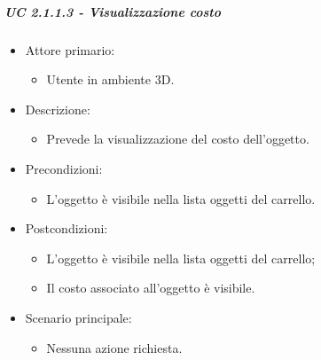 \subparagraph{UC 2.1.1.3 - Visualizzazione costo}
\begin{itemize}
	
	\item Attore primario: 
	\begin{itemize}
		\item Utente in ambiente 3D.
	\end{itemize}
	\item Descrizione:
	\begin{itemize}
		\item Prevede la visualizzazione del costo dell'oggetto.
	\end{itemize}
	
	\item Precondizioni:
	\begin{itemize}
		\item L'oggetto è visibile nella lista oggetti del carrello.
	\end{itemize}
	
	\item Postcondizioni:
	\begin{itemize}
		\item L'oggetto è visibile nella lista oggetti del carrello;
		\item Il costo associato all'oggetto è visibile.
	\end{itemize}
	
	\item Scenario principale:
	\begin{itemize}
		\item Nessuna azione richiesta.
	\end{itemize}
	
\end{itemize}

